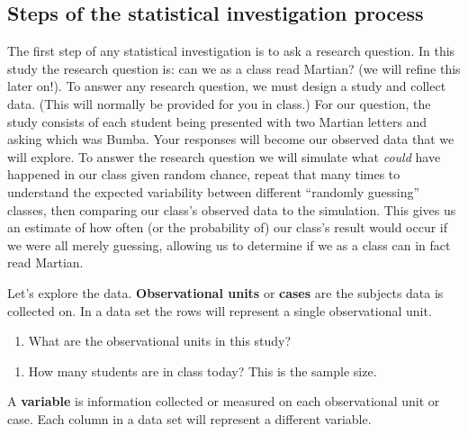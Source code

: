 \documentclass[
]{report}
\providecommand{\tightlist}{%
  \setlength{\itemsep}{0pt}\setlength{\parskip}{0pt}}
\begin{document}
\vspace{0.2in}

\hypertarget{steps-of-the-statistical-investigation-process}{%
\subsection{Steps of the statistical investigation process}\label{steps-of-the-statistical-investigation-process}}

The first step of any statistical investigation is to ask a research question. In this study the research question is: can we as a class read Martian? (we will refine this later on!). To answer any research question, we must design a study and collect data. (This will normally be provided for you in class.) For our question, the study consists of each student being presented with two Martian letters and asking which was Bumba. Your responses will become our observed data that we will explore. To answer the research question we will simulate what \emph{could} have happened in our class given random chance, repeat that many times to understand the expected variability between different ``randomly guessing'' classes, then comparing our class's observed data to the simulation. This gives us an estimate of how often (or the probability of) our class's result would occur if we were all merely guessing, allowing us to determine if we as a class can in fact read Martian.

Let's explore the data.
\textbf{Observational units} or \textbf{cases} are the subjects data is collected on. In a data set the rows will represent a single observational unit.

\begin{enumerate}
\def\labelenumi{\arabic{enumi}.}
\tightlist
\item
  What are the observational units in this study?
\end{enumerate}

\vspace{0.5in}

\begin{enumerate}
\def\labelenumi{\arabic{enumi}.}
\setcounter{enumi}{1}
\tightlist
\item
  How many students are in class today? This is the sample size.
\end{enumerate}

\vspace{0.3in}

A \textbf{variable} is information collected or measured on each observational unit or case. Each column in a data set will represent a different variable.
\end{document}
